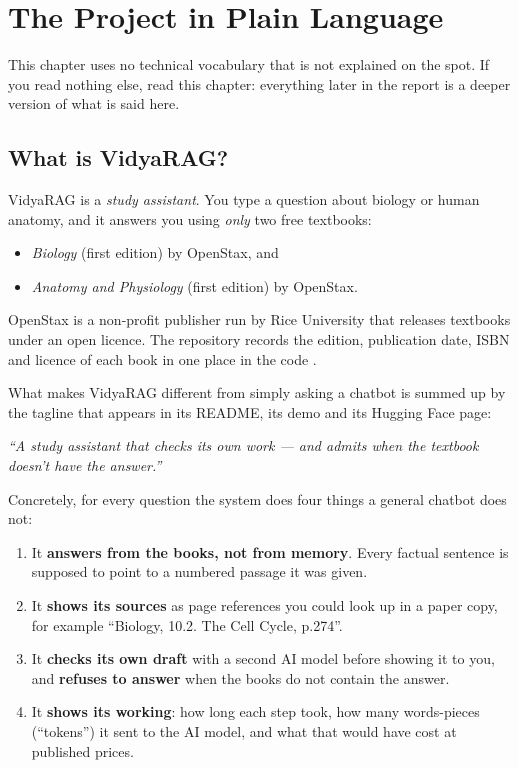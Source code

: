 \chapter{The Project in Plain Language}
\label{ch:plain}

This chapter uses no technical vocabulary that is not explained on the spot. If you read nothing else, read this chapter: everything later in the report is a deeper version of what is said here.

\section{What is VidyaRAG?}

VidyaRAG is a \emph{study assistant}. You type a question about biology or human anatomy, and it answers you using \emph{only} two free textbooks:

\begin{itemize}
  \item \emph{Biology} (first edition) by OpenStax, and
  \item \emph{Anatomy and Physiology} (first edition) by OpenStax.
\end{itemize}

OpenStax is a non-profit publisher run by Rice University that releases textbooks under an open licence. The repository records the edition, publication date, ISBN and licence of each book in one place in the code .

What makes VidyaRAG different from simply asking a chatbot is summed up by the tagline that appears in its README, its demo and its Hugging Face page:

\begin{keyidea}
\emph{``A study assistant that checks its own work --- and admits when the textbook doesn't have the answer.''}
\end{keyidea}

Concretely, for every question the system does four things a general chatbot does not:
\begin{enumerate}
  \item It \textbf{answers from the books, not from memory}. Every factual sentence is supposed to point to a numbered passage it was given.
  \item It \textbf{shows its sources} as page references you could look up in a paper copy, for example \enquote{Biology, 10.2. The Cell Cycle, p.274}.
  \item It \textbf{checks its own draft} with a second AI model before showing it to you, and \textbf{refuses to answer} when the books do not contain the answer.
  \item It \textbf{shows its working}: how long each step took, how many words-pieces (``tokens'') it sent to the AI model, and what that would have cost at published prices.
\end{enumerate}

